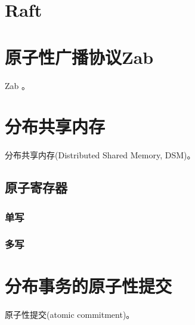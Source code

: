 \chapter{Raft}



\chapter{原子性广播协议Zab}

Zab \cite{Junqueira11, Medeiros12}。


\chapter{分布共享内存}

分布共享内存(Distributed Shared Memory, DSM)。



\section{原子寄存器}

\subsection{单写}

\subsection{多写}



\chapter{分布事务的原子性提交}

原子性提交(atomic commitment)。